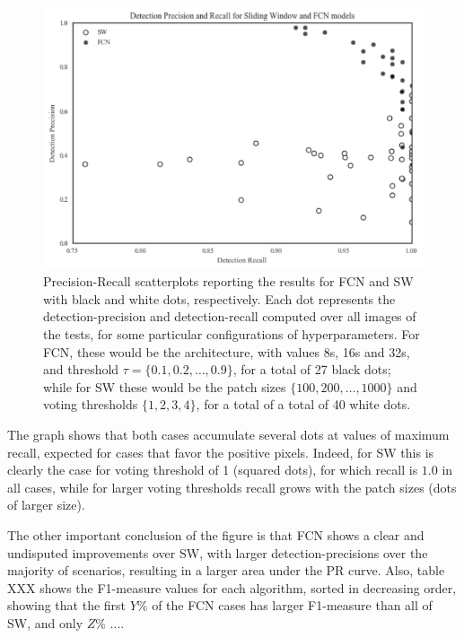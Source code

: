 \documentclass[a4paper,authoryear,review]{elsarticle}
\begin{document}
\begin{figure}
	\centering
	\includegraphics[width=12cm]{figures/detection-scatter-plot.png}
	\caption{Precision-Recall scatterplots reporting the results for FCN and SW with black and white dots, respectively. Each dot represents the detection-precision and detection-recall computed over all images of the tests, for some particular  configurations of hyperparameters. For FCN, these would be the architecture, with values 8s, 16s and 32s, and threshold $\tau = \{0.1, 0.2, \ldots, 0.9\}$,  for a total of 27 black dots; while for SW these would be the patch sizes  $\{100, 200, \ldots, 1000\}$ and voting thresholds $\{1, 2, 3, 4\}$, for a total of a total of 40 white dots.}
	\label{fig:detection-scatter-plot}
\end{figure}

The graph shows that both cases accumulate several dots at values of maximum recall, expected for cases that favor the positive pixels. Indeed, for SW this is clearly the case for voting threshold of 1 (squared dots), for which recall is $1.0$ in all cases, while for larger voting thresholds recall grows with the patch sizes (dots of larger size).

The other important conclusion of the figure is that FCN shows a clear and undisputed improvements over SW, with larger detection-precisions over the majority of scenarios, resulting in a larger area under the PR curve. Also, table XXX shows the F1-measure values for each algorithm, sorted in decreasing order,  showing that the first $Y\%$ of the FCN cases has larger F1-measure than all of SW, and only $Z\%$ ....
\end{document}
